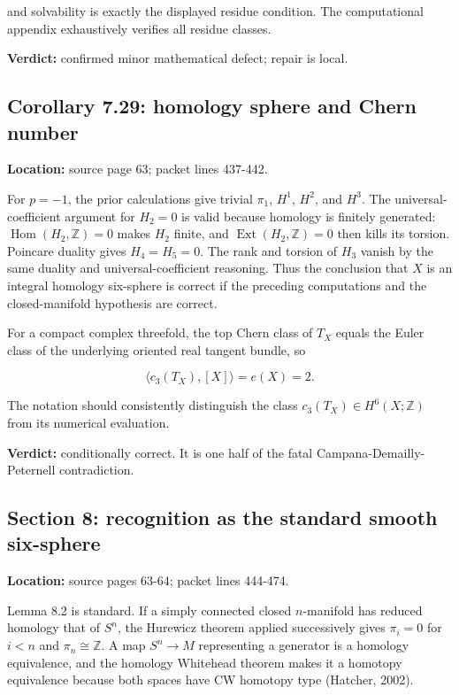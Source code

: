 \documentclass[
  10pt,
]{article}
\begin{document}
and solvability is exactly the displayed residue condition. The
computational appendix exhaustively verifies all residue classes.

\textbf{Verdict:} confirmed minor mathematical defect; repair is local.

\subsection{Corollary 7.29: homology sphere and Chern
number}\label{corollary-7.29-homology-sphere-and-chern-number}

\textbf{Location:} source page 63; packet lines 437-442.

For \(p=-1\), the prior calculations give trivial \(\pi_1\), \(H^1\),
\(H^2\), and \(H^3\). The universal-coefficient argument for \(H_2=0\)
is valid because homology is finitely generated:
\(\operatorname{Hom}(H_2,\mathbb Z)=0\) makes \(H_2\) finite, and
\(\operatorname{Ext}(H_2,\mathbb Z)=0\) then kills its torsion. Poincare
duality gives \(H_4=H_5=0\). The rank and torsion of \(H_3\) vanish by
the same duality and universal-coefficient reasoning. Thus the
conclusion that \(X\) is an integral homology six-sphere is correct if
the preceding computations and the closed-manifold hypothesis are
correct.

For a compact complex threefold, the top Chern class of \(T_X\) equals
the Euler class of the underlying oriented real tangent bundle, so

\[
\langle c_3(T_X),[X]\rangle=e(X)=2.
\]

The notation should consistently distinguish the class
\(c_3(T_X)\in H^6(X;\mathbb Z)\) from its numerical evaluation.

\textbf{Verdict:} conditionally correct. It is one half of the fatal
Campana-Demailly-Peternell contradiction.

\subsection{Section 8: recognition as the standard smooth
six-sphere}\label{section-8-recognition-as-the-standard-smooth-six-sphere}

\textbf{Location:} source pages 63-64; packet lines 444-474.

Lemma 8.2 is standard. If a simply connected closed \(n\)-manifold has
reduced homology that of \(S^n\), the Hurewicz theorem applied
successively gives \(\pi_i=0\) for \(i<n\) and \(\pi_n\cong\mathbb Z\).
A map \(S^n\to M\) representing a generator is a homology equivalence,
and the homology Whitehead theorem makes it a homotopy equivalence
because both spaces have CW homotopy type (Hatcher, 2002).
\end{document}
